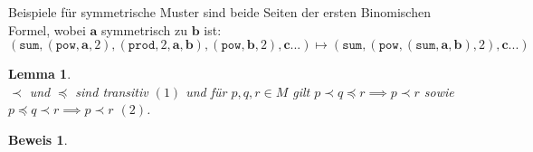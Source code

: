 
Beispiele für symmetrische Muster sind beide Seiten der ersten Binomischen Formel, wobei $\mathbf a$ symmetrisch zu $\mathbf b$ ist:
$$(\texttt{sum}, (\texttt{pow}, \mathbf a, 2), (\texttt{prod}, 2, \mathbf a, \mathbf b), (\texttt{pow}, \mathbf b, 2), \mathbf {c...}) \mapsto (\texttt{sum}, (\texttt{pow}, (\texttt{sum}, \mathbf a, \mathbf b), 2), \mathbf {c...})$$


\newtheorem{lemTransitivStark}[bsp]{Lemma}
\begin{lemTransitivStark}~\\
$\prec$ und $\preceq$ sind transitiv $(1)$ und für $p, q, r \in M$  gilt $p \prec q \preceq r \implies p \prec r$ sowie $p \preceq q \prec r \implies p \prec r$ $(2)$. 
\end{lemTransitivStark}

\newtheorem{bewTransitivStark}[bsp]{Beweis}
\begin{bewTransitivStark}~\\
\end{bewTransitivStark}
























